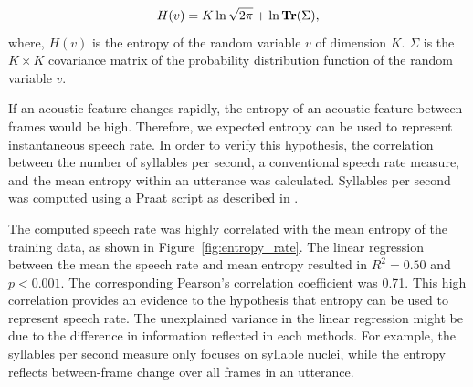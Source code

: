 \begin{equation}
    H(v) = K \ln{\sqrt{2\pi}} + \ln{\operatorname{\textbf{Tr}}({\Sigma})},
\end{equation}
where, $H(v)$ is the entropy of the random variable $v$ of dimension $K$. $\Sigma$ is the $ K \times K $ covariance matrix of the probability distribution function of the random variable $v$.  



If an acoustic feature changes rapidly, the entropy of an acoustic feature between frames would be high. 
Therefore, we expected entropy can be used to represent instantaneous speech rate.
In order to verify this hypothesis, the correlation between the number of syllables per second, a conventional speech rate measure, and the mean entropy within an utterance was calculated.
Syllables per second was computed using a Praat script as described in \cite{DeJong2009}.

The computed speech rate was highly correlated with the mean entropy of the training data, as shown in Figure~\ref{fig:entropy_rate}. The linear regression between the mean the speech rate and mean entropy resulted in $R^2=0.50$ and $p<0.001$.  The corresponding Pearson's correlation coefficient was 0.71. This high correlation provides an evidence to the hypothesis that entropy can be used to represent speech rate.
The unexplained variance in the linear regression might be due to the difference in information reflected in each methods.
For example, the syllables per second measure only focuses on syllable nuclei,
while the entropy reflects between-frame change over all frames in an utterance.



